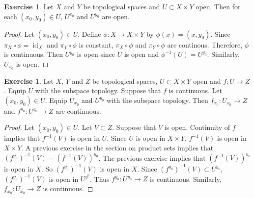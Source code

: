 \documentclass[12pt]{amsart}
\theoremstyle{definition}
\newtheorem{ex}[definition]{Exercise}
\DeclareMathOperator{\id}{id}
\DeclareMathOperator*{\0}{\mbf{0}}
\DeclareMathOperator*{\1}{\mbf{1}}
\begin{document}
	\begin{ex}
		Let $X$ and $Y$ be topological spaces and $U \subset X \times Y$ open. Then for each $(x_0,  y_0) \in U$, $U^{x_0}$ and $U^{y_0}$ are open.
	\end{ex}
	
	\begin{proof}
		Let $(x_0, y_0) \in U$. Define $\phi: X \rightarrow X \times Y$ by $\phi(x) = (x, y_0)$. Since $\pi_X \circ \phi = \id_X$ and $\pi_Y \circ \phi$ is constant, $\pi_X \circ \phi$ and $\pi_Y \circ \phi$ are continous. Therefore, $\phi$ is continuous. Then $U^{y_0}$ is open since $U$ is open and $\phi^{-1}(U) = U^{y_0}$. Similarly, $U_{x_0}$ is open.
	\end{proof}

	\begin{ex}
		Let $X$, $Y$ and $Z$ be topological spaces, $U \subset X \times Y$ open and $f: U \rightarrow Z$. Equip $U$ with the subspace topology. Suppose that $f$ is continuous. Let $(x_0, y_0) \in U$. Equip $U_{x_0}$ and $U^{y_0}$ with the subspace topology. Then $f_{x_0}:U_{x_0} \rightarrow Z$ and $f^{y_0}: U^{y_0} \rightarrow Z$ are continuous.
	\end{ex}

	\begin{proof}
		Let $(x_0, y_0) \in U$. Let $V \subset Z$. Suppose that $V$ is open. Continuity of $f$ implies that $f^{-1}(V)$ is open in $U$. Since $U$ is open in $X \times Y$, $f^{-1}(V)$ is open in $X \times Y$. A previous exercise in the section on product sets implies that $(f^{y_0})^{-1}(V) = (f^{-1}(V))^{y_0}$. The previous exercise implies that $(f^{-1}(V))^{y_0}$ is open in $X$. So $(f^{y_0})^{-1}(V)$ is open in $X$. Since $(f^{y_0})^{-1}(V) \subset U^{y_0}$, $(f^{y_0})^{-1}(V)$ is open in $U^{y^0}$. Thus $f^{y_0}: U^{y_0} \rightarrow Z$ is continuous. Similarly, $f_{x_0}: U_{x_0} \rightarrow Z$ is continuous.
	\end{proof}
	

	
	
	
	
	
	
	
	
	
	
	
	
	
	
	
	
	
	
	
	
	
	
	
	
\end{document}
